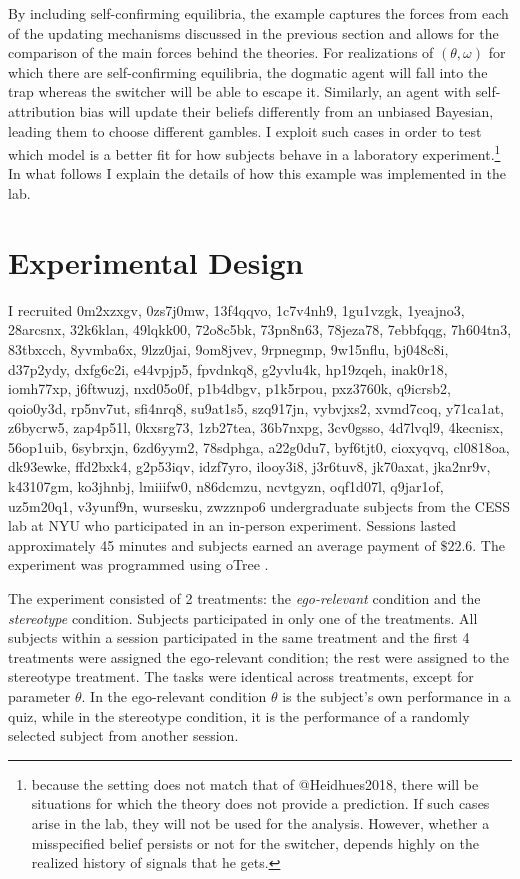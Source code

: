 \documentclass[
  12pt,
]{article}
\begin{document}
By including self-confirming equilibria, the example captures the forces
from each of the updating mechanisms discussed in the previous section
and allows for the comparison of the main forces behind the theories.
For realizations of \((\theta, \omega)\) for which there are
self-confirming equilibria, the dogmatic agent will fall into the trap
whereas the switcher will be able to escape it. Similarly, an agent with
self-attribution bias will update their beliefs differently from an
unbiased Bayesian, leading them to choose different gambles. I exploit
such cases in order to test which model is a better fit for how subjects
behave in a laboratory
experiment.\footnote{because the setting does not match that of @Heidhues2018, there will be situations for which the theory 
does not provide a prediction. If such cases arise in the lab, they will not be used for the analysis. However, whether a misspecified 
belief persists or not for the switcher, depends highly on the realized history of signals that he gets.}
In what follows I explain the details of how this example was
implemented in the lab.

\hypertarget{experimental-design}{%
\section{Experimental Design}\label{experimental-design}}

I recruited 0m2xzxgv, 0zs7j0mw, 13f4qqvo, 1c7v4nh9, 1gu1vzgk, 1yeajno3,
28arcsnx, 32k6klan, 49lqkk00, 72o8c5bk, 73pn8n63, 78jeza78, 7ebbfqqg,
7h604tn3, 83tbxcch, 8yvmba6x, 9lzz0jai, 9om8jvev, 9rpnegmp, 9w15nflu,
bj048c8i, d37p2ydy, dxfg6c2i, e44vpjp5, fpvdnkq8, g2yvlu4k, hp19zqeh,
inak0r18, iomh77xp, j6ftwuzj, nxd05o0f, p1b4dbgv, p1k5rpou, pxz3760k,
q9icrsb2, qoio0y3d, rp5nv7ut, sfi4nrq8, su9at1s5, szq917jn, vybvjxs2,
xvmd7coq, y71ca1at, z6bycrw5, zap4p51l, 0kxsrg73, 1zb27tea, 36b7nxpg,
3cv0gsso, 4d7lvql9, 4kecnisx, 56op1uib, 6sybrxjn, 6zd6yym2, 78sdphga,
a22g0du7, byf6tjt0, cioxyqvq, cl0818oa, dk93ewke, ffd2bxk4, g2p53iqv,
idzf7yro, ilooy3i8, j3r6tuv8, jk70axat, jka2nr9v, k43107gm, ko3jhnbj,
lmiiifw0, n86dcmzu, ncvtgyzn, oqf1d07l, q9jar1of, uz5m20q1, v3yunf9n,
wursesku, zwzznpo6 undergraduate subjects from the CESS lab at NYU who
participated in an in-person experiment. Sessions lasted approximately
45 minutes and subjects earned an average payment of \(\$22.6\). The
experiment was programmed using oTree \citep{otree}.

The experiment consisted of 2 treatments: the \emph{ego-relevant}
condition and the \emph{stereotype} condition. Subjects participated in
only one of the treatments. All subjects within a session participated
in the same treatment and the first 4 treatments were assigned the
ego-relevant condition; the rest were assigned to the stereotype
treatment. The tasks were identical across treatments, except for
parameter \(\theta\). In the ego-relevant condition \(\theta\) is the
subject's own performance in a quiz, while in the stereotype condition,
it is the performance of a randomly selected subject from another
session.
\end{document}
